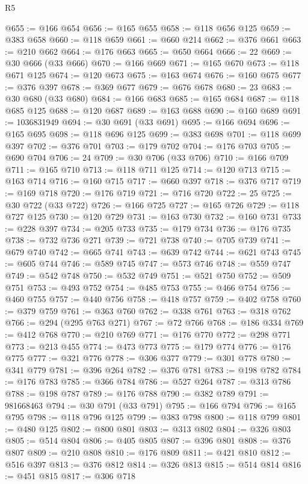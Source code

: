 \begin{lexlean}{R5}
\begin{coremodule}
@655 := @166 @654
@656 := @165 @655
@658 := @118 @656 @125
@659 := @383 @658
@660 := @118 @659
@661 := @660 @214
@662 := @376 @661
@663 := @210 @662
@664 := @176 @663
@665 := @650 @664
@666 := 22
@669 := @30 @666 (@33 @666)
@670 := @166 @669
@671 := @165 @670
@673 := @118 @671 @125
@674 := @120 @673
@675 := @163 @674
@676 := @160 @675
@677 := @376 @397
@678 := @369 @677
@679 := @676 @678
@680 := 23
@683 := @30 @680 (@33 @680)
@684 := @166 @683
@685 := @165 @684
@687 := @118 @685 @125
@688 := @120 @687
@689 := @163 @688
@690 := @160 @689
@691 := 1036831949
@694 := @30 @691 (@33 @691)
@695 := @166 @694
@696 := @165 @695
@698 := @118 @696 @125
@699 := @383 @698
@701 := @118 @699 @397
@702 := @376 @701
@703 := @179 @702
@704 := @176 @703
@705 := @690 @704
@706 := 24
@709 := @30 @706 (@33 @706)
@710 := @166 @709
@711 := @165 @710
@713 := @118 @711 @125
@714 := @120 @713
@715 := @163 @714
@716 := @160 @715
@717 := @660 @397
@718 := @376 @717
@719 := @169 @718
@720 := @176 @719
@721 := @716 @720
@722 := 25
@725 := @30 @722 (@33 @722)
@726 := @166 @725
@727 := @165 @726
@729 := @118 @727 @125
@730 := @120 @729
@731 := @163 @730
@732 := @160 @731
@733 := @228 @397
@734 := @205 @733
@735 := @179 @734
@736 := @176 @735
@738 := @732 @736 @271
@739 := @721 @738
@740 := @705 @739
@741 := @679 @740
@742 := @665 @741
@743 := @639 @742
@744 := @621 @743
@745 := @605 @744
@746 := @589 @745
@747 := @573 @746
@748 := @559 @747
@749 := @542 @748
@750 := @532 @749
@751 := @521 @750
@752 := @509 @751
@753 := @493 @752
@754 := @485 @753
@755 := @466 @754
@756 := @460 @755
@757 := @440 @756
@758 := @418 @757
@759 := @402 @758
@760 := @379 @759
@761 := @363 @760
@762 := @338 @761
@763 := @318 @762
@766 := @294 (@295 @763 @271)
@767 := @72 @766
@768 := @186 @334
@769 := @412 @768
@770 := @210 @769
@771 := @176 @770
@772 := @298 @771
@773 := @213 @455
@774 := @473 @773
@775 := @179 @774
@776 := @176 @775
@777 := @321 @776
@778 := @306 @377
@779 := @301 @778
@780 := @341 @779
@781 := @396 @264
@782 := @376 @781
@783 := @198 @782
@784 := @176 @783
@785 := @366 @784
@786 := @527 @264
@787 := @313 @786
@788 := @198 @787
@789 := @176 @788
@790 := @382 @789
@791 := 981668463
@794 := @30 @791 (@33 @791)
@795 := @166 @794
@796 := @165 @795
@798 := @118 @796 @125
@799 := @383 @798
@800 := @118 @799
@801 := @480 @125
@802 := @800 @801
@803 := @313 @802
@804 := @326 @803
@805 := @514 @804
@806 := @405 @805
@807 := @396 @801
@808 := @376 @807
@809 := @210 @808
@810 := @176 @809
@811 := @421 @810
@812 := @516 @397
@813 := @376 @812
@814 := @326 @813
@815 := @514 @814
@816 := @451 @815
@817 := @306 @718

\end{coremodule}
\end{lexlean}
